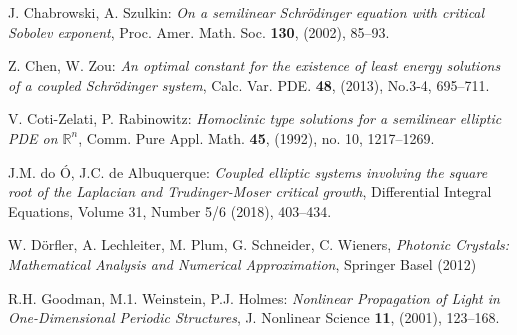 \documentclass{scrartcl}
\newcommand{\R}{\mathbb{R}}
\numberwithin{equation}{section}
\begin{document}
\begin{thebibliography}{99}
 J. Chabrowski, A. Szulkin: {\em On a semilinear Schr\"odinger equation with critical Sobolev exponent}, Proc. Amer. Math. Soc. \textbf{130}, (2002), 85--93.

 Z. Chen, W. Zou: {\em An optimal constant for the existence of least energy solutions of a coupled Schr\"odinger system}, Calc. Var. PDE. \textbf{48}, (2013), No.3-4, 695--711.




 V. Coti-Zelati, P. Rabinowitz: {\em Homoclinic type solutions for a semilinear elliptic PDE on $\R^n$}, Comm. Pure Appl. Math. \textbf{45}, (1992), no. 10, 1217--1269.


 J.M. do \'{O}, J.C. de Albuquerque: {\em Coupled elliptic systems involving the square root of the Laplacian and Trudinger-Moser critical growth}, Differential Integral Equations, Volume 31, Number 5/6 (2018), 403--434.

 W. D\"orfler, A. Lechleiter, M. Plum, G. Schneider, C. Wieners, {\em Photonic Crystals: Mathematical Analysis and Numerical Approximation}, Springer Basel (2012)


 R.H. Goodman, M.1. Weinstein, P.J. Holmes: {\em Nonlinear Propagation of Light in One-Dimensional Periodic Structures}, J. Nonlinear Science \textbf{11}, (2001), 123--168.


\end{thebibliography}
\end{document}
